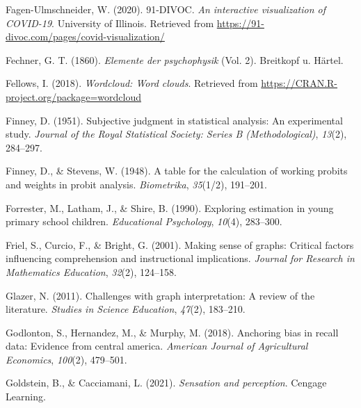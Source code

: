 \documentclass[print]{nuthesis}
\newlength{\cslhangindent}
\newenvironment{CSLReferences}[2]%
{\setlength{\parindent}{0pt}%
\everypar{\setlength{\hangindent}{\cslhangindent}}\ignorespaces}%
{\par}
\begin{document}
\begin{CSLReferences}{1}{0}
\leavevmode{}%
Fagen-Ulmschneider, W. (2020). 91-DIVOC. \emph{An interactive visualization of COVID-19}. University of Illinois. Retrieved from \url{https://91-divoc.com/pages/covid-visualization/}

\leavevmode{}%
Fechner, G. T. (1860). \emph{Elemente der psychophysik} (Vol. 2). Breitkopf u. H{ä}rtel.

\leavevmode{}%
Fellows, I. (2018). \emph{Wordcloud: Word clouds}. Retrieved from \url{https://CRAN.R-project.org/package=wordcloud}

\leavevmode{}%
Finney, D. (1951). Subjective judgment in statistical analysis: An experimental study. \emph{Journal of the Royal Statistical Society: Series B (Methodological)}, \emph{13}(2), 284--297.

\leavevmode{}%
Finney, D., \& Stevens, W. (1948). A table for the calculation of working probits and weights in probit analysis. \emph{Biometrika}, \emph{35}(1/2), 191--201.

\leavevmode{}%
Forrester, M., Latham, J., \& Shire, B. (1990). Exploring estimation in young primary school children. \emph{Educational Psychology}, \emph{10}(4), 283--300.

\leavevmode{}%
Friel, S., Curcio, F., \& Bright, G. (2001). Making sense of graphs: Critical factors influencing comprehension and instructional implications. \emph{Journal for Research in Mathematics Education}, \emph{32}(2), 124--158.

\leavevmode{}%
Glazer, N. (2011). Challenges with graph interpretation: A review of the literature. \emph{Studies in Science Education}, \emph{47}(2), 183--210.

\leavevmode{}%
Godlonton, S., Hernandez, M., \& Murphy, M. (2018). Anchoring bias in recall data: Evidence from central america. \emph{American Journal of Agricultural Economics}, \emph{100}(2), 479--501.

\leavevmode{}%
Goldstein, B., \& Cacciamani, L. (2021). \emph{Sensation and perception}. Cengage Learning.


\end{CSLReferences}
\end{document}
